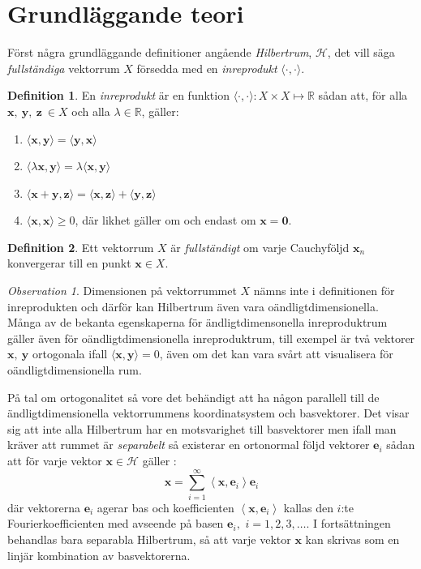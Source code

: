 \documentclass[a4paper, 12pt]{report}
\theoremstyle{definition}
\newtheorem{defi}{Definition}[section]
\theoremstyle{remark}
\newtheorem*{rem}{Observation}
\newcommand{\inprod}[2]{\langle \mathbf{#1}, \mathbf{#2}\rangle}
\begin{document}
\section{Grundläggande teori}
Först några grundläggande definitioner angående \emph{Hilbertrum}, $\mathcal{H}$, det vill säga \emph{fullständiga} vektorrum $X$ försedda med en \emph{inreprodukt} $\langle \cdot , \cdot \rangle$.

\begin{defi}
En \emph{inreprodukt} är en funktion $\langle \cdot , \cdot \rangle: X\times X \longmapsto \mathbb{R}$ sådan att, för alla $\mathbf{x},~\mathbf{y},~\mathbf{z}~\in X$ och alla $\lambda \in \mathbb{R}$, gäller:
\begin{enumerate}
\item $\inprod{x}{y} = \inprod{y}{x}$
\item $\langle \lambda \mathbf{x}, \mathbf{y}\rangle = \lambda \inprod{x}{y}$
\item $\inprod{x+y}{z} =\inprod{x}{z} + \inprod{y}{z}$
\item $\inprod{x}{x} \geq 0$, där likhet gäller om och endast om $\mathbf{x} = \mathbf{0}$. 
\end{enumerate}
\end{defi}
\begin{defi}
Ett vektorrum $X$ är \emph{fullständigt} om varje Cauchyföljd $\mathbf{x}_n$ konvergerar till en punkt $\mathbf{x}\in X$.
\end{defi}

\begin{rem}
Dimensionen på vektorrummet $X$ nämns inte i definitionen för inreprodukten och därför kan Hilbertrum även vara oändligtdimensionella. Många av de bekanta egenskaperna för ändligtdimensonella inreproduktrum gäller även för oändligtdimensionella inreproduktrum, till exempel är två vektorer $\mathbf{x}, ~\mathbf{y}$ ortogonala ifall $\inprod{x}{y}=0$, även om det kan vara svårt att visualisera för oändligtdimensionella rum.
\end{rem}
På tal om ortogonalitet så vore det behändigt att ha någon parallell till de ändligtdimensionella vektorrummens koordinatsystem och basvektorer. Det visar sig att inte alla Hilbertrum har en motsvarighet till basvektorer men ifall man kräver att rummet är \emph{separabelt} så existerar en ortonormal följd vektorer $\mathbf{e}_i$ sådan att för varje vektor $\mathbf{x}\in \mathcal{H}$  gäller \cite{Young}:
\begin{equation*}
	\mathbf{x}=\sum_{i=1}^{\infty}\left\langle \mathbf{x}, \mathbf{e}_i \right\rangle \mathbf{e}_i
\end{equation*}
där vektorerna $\mathbf{e}_i$ agerar bas och koefficienten $\left\langle \mathbf{x}, \mathbf{e}_i \right\rangle$ kallas den $i$:te Fourierkoefficienten med avseende på basen $\mathbf{e}_i,$ $i=1,2,3,\dots$. I fortsättningen behandlas bara separabla Hilbertrum, så att varje vektor $\mathbf{x}$ kan skrivas som en linjär kombination av basvektorerna.
\end{document}
